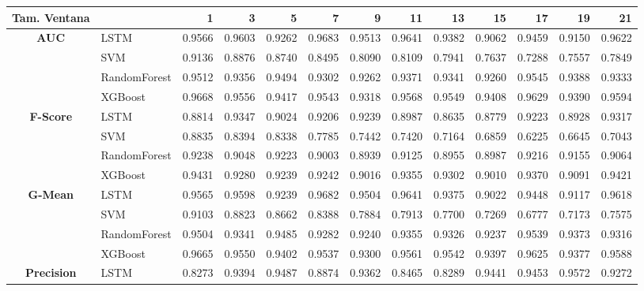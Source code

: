 \begin{table}[h]
	\centering
	\begin{adjustbox}{max width=15cm}
		\begin{tabular}{|c|l|r|r|r|r|r|r|r|r|r|r|r|}
			\hline
			\textbf{Tam. Ventana}&         &      1  &      3  &      5  &      7  &      9  &      11 &      13 &      15 &      17 &      19 &      21 \\
			\hline
			\textbf{AUC} & LSTM &  0.9566 &  0.9603 &  0.9262 &  0.9683 &  0.9513 &  0.9641 &  0.9382 &  0.9062 &  0.9459 &  0.9150 &  0.9622 \\
			& SVM &  0.9136 &  0.8876 &  0.8740 &  0.8495 &  0.8090 &  0.8109 &  0.7941 &  0.7637 &  0.7288 &  0.7557 &  0.7849 \\
			& RandomForest &  0.9512 &  0.9356 &  0.9494 &  0.9302 &  0.9262 &  0.9371 &  0.9341 &  0.9260 &  0.9545 &  0.9388 &  0.9333 \\
			& XGBoost &  0.9668 &  0.9556 &  0.9417 &  0.9543 &  0.9318 &  0.9568 &  0.9549 &  0.9408 &  0.9629 &  0.9390 &  0.9594 \\
			\hline
			\textbf{F-Score} & LSTM &  0.8814 &  0.9347 &  0.9024 &  0.9206 &  0.9239 &  0.8987 &  0.8635 &  0.8779 &  0.9223 &  0.8928 &  0.9317 \\
			& SVM &  0.8835 &  0.8394 &  0.8338 &  0.7785 &  0.7442 &  0.7420 &  0.7164 &  0.6859 &  0.6225 &  0.6645 &  0.7043 \\
			& RandomForest &  0.9238 &  0.9048 &  0.9223 &  0.9003 &  0.8939 &  0.9125 &  0.8955 &  0.8987 &  0.9216 &  0.9155 &  0.9064 \\
			& XGBoost &  0.9431 &  0.9280 &  0.9239 &  0.9242 &  0.9016 &  0.9355 &  0.9302 &  0.9010 &  0.9370 &  0.9091 &  0.9421 \\
			\hline
			\textbf{G-Mean} & LSTM &  0.9565 &  0.9598 &  0.9239 &  0.9682 &  0.9504 &  0.9641 &  0.9375 &  0.9022 &  0.9448 &  0.9117 &  0.9618 \\
			& SVM &  0.9103 &  0.8823 &  0.8662 &  0.8388 &  0.7884 &  0.7913 &  0.7700 &  0.7269 &  0.6777 &  0.7173 &  0.7575 \\
			& RandomForest &  0.9504 &  0.9341 &  0.9485 &  0.9282 &  0.9240 &  0.9355 &  0.9326 &  0.9237 &  0.9539 &  0.9373 &  0.9316 \\
			& XGBoost &  0.9665 &  0.9550 &  0.9402 &  0.9537 &  0.9300 &  0.9561 &  0.9542 &  0.9397 &  0.9625 &  0.9377 &  0.9588 \\
			\hline
			\textbf{Precision} & LSTM &  0.8273 &  0.9394 &  0.9487 &  0.8874 &  0.9362 &  0.8465 &  0.8289 &  0.9441 &  0.9453 &  0.9572 &  0.9272 \\

\end{tabular}
\end{adjustbox}
\end{table}
